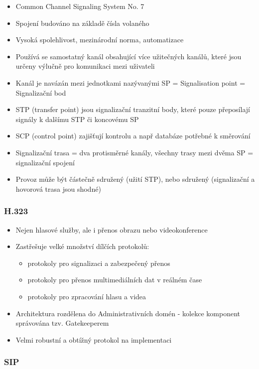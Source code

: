 \documentclass[10pt,a4paper]{article}
\begin{document}
\begin{itemize}
\item Common Channel Signaling System No. 7
\item Spojení budováno na základě čísla volaného
\item Vysoká spolehlivost, mezinárodní norma, automatizace
\item Používá se samostatný kanál obsahující více užitečných kanálů, které jsou určeny výlučně pro komunikaci mezi uživateli
\item Kanál je navázán mezi jednotkami nazývanými SP = Signalisation point = Signalizační bod
\item STP (transfer point) jsou signalizační tranzitní body, které pouze přeposílají signály k dalšímu STP či koncovému SP
\item SCP (control point) zajišťují kontrolu a např databáze potřebné k směrování
\item Signalizační trasa = dva protisměrné kanály, všechny trasy mezi dvěma SP = signalizační spojení
\item Provoz může být částečně sdružený (užití STP), nebo sdružený (signalizační a hovorová trasa jsou shodné)
\end{itemize}
\subsubsection{H.323}

\begin{itemize}
\item Nejen hlasové služby, ale i přenos obrazu nebo videokonference
\item Zastřešuje velké množství dílčích protokolů:
\begin{itemize}
\item protokoly pro signalizaci a zabezpečený přenos
\item protokoly pro přenos multimediálních dat v reálném čase
\item protokoly pro zpracování hlasu a videa
\end{itemize}
\item Architektura rozdělena do Administrativních domén - kolekce komponent správována tzv. Gatekeeperem
\item Velmi robustní a obtížný protokol na implementaci
\end{itemize}
\subsubsection{SIP}
\end{document}
